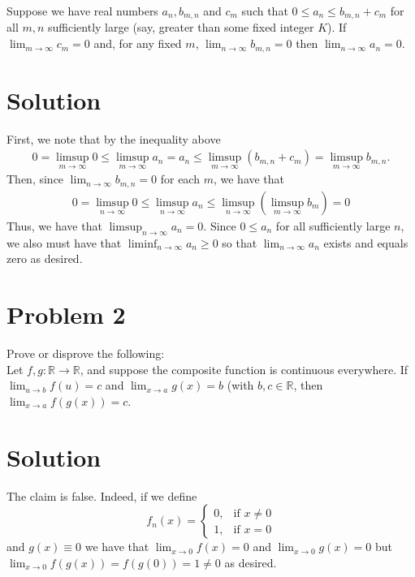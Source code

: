 \documentclass{article}
\begin{document}
\noindent Suppose we have real numbers $a_n, b_{m,n}$ and $c_m$ such that $0\leq a_n\leq b_{m,n}+c_m$ for all $m,n$ sufficiently large (say, greater than some fixed integer $K$).  If $\lim_{m\rightarrow\infty} c_m=0$ and, for any fixed $m$, $\lim_{n\rightarrow\infty}b_{m,n}=0$ then $\lim_{n\rightarrow\infty} a_n=0$.

\section*{Solution}
First, we note that by the inequality above
\begin{align*}
0=\limsup_{m\rightarrow\infty}0\leq\limsup_{m\rightarrow\infty}a_n=a_n\leq\limsup_{m\rightarrow\infty}(b_{m,n}+c_m)=\limsup_{m\rightarrow\infty}b_{m,n}.
\end{align*}
Then, since $\lim_{n\rightarrow\infty}b_{m,n}=0$ for each $m$, we have that
\begin{align*}
0=\limsup_{n\rightarrow\infty}0\leq\limsup_{n\rightarrow\infty}a_n\leq\limsup_{n\rightarrow\infty}(\limsup_{m\rightarrow\infty} b_m)=0
\end{align*}
Thus, we have that $\limsup_{n\rightarrow\infty}a_n=0$.  Since $0\leq a_n$ for all sufficiently large $n$, we also must have that $\liminf_{n\rightarrow\infty}a_n\geq0$ so that $\lim_{n\rightarrow\infty}a_n$ exists and equals zero as desired.

\section*{Problem 2}
Prove or disprove the following:\\

\noindent Let $f,g:\mathbb{R}\rightarrow\mathbb{R}$, and suppose the composite function is continuous everywhere.  If $\lim_{u\rightarrow b}f(u)=c$ and $\lim_{x\rightarrow a}g(x)=b$ (with $b,c\in\mathbb{R}$, then $\lim_{x\rightarrow a}f(g(x))=c$.

\section*{Solution}
The claim is false.  Indeed, if we define $$
f_n(x) =
\begin{cases}
0, & \text{if }x\neq 0 \\
1, & \text{if }x=0
\end{cases}
$$
and $g(x)\equiv0$ we have that $\lim_{x\rightarrow0}f(x)=0$ and $\lim_{x\rightarrow0}g(x)=0$ but $\lim_{x\rightarrow0}f(g(x))=f(g(0))=1\neq 0$ as desired.
\end{document}
